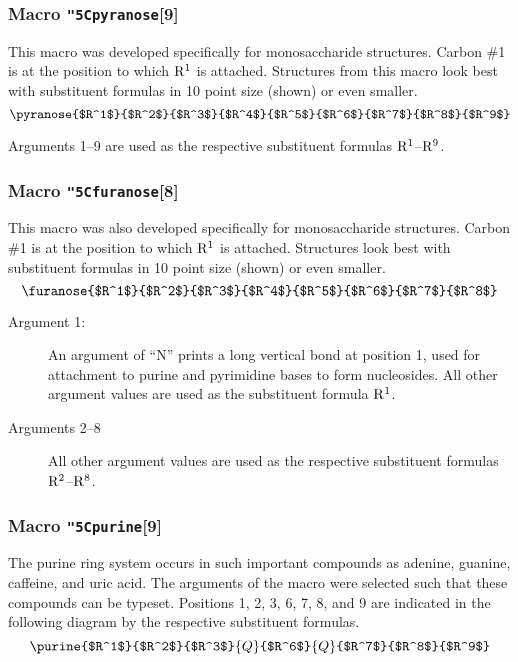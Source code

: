 \subsubsection{Macro {\tt\char"5C{}pyranose}[9]}
  This macro was developed specifically for monosaccharide
 structures. Carbon \#1 is at the position to which
 ${\rm R^1}$ is attached. Structures from this macro look
 best with substituent formulas in 10 point size (shown)
 or even smaller.
 \[ \pyranose{$R^1$}{$R^2$}{$R^3$}{$R^4$}{$R^5$}{$R^6$}
             {$R^7$}{$R^8$}{$R^9$}  \]
 
 Arguments 1--9 are used as the respective substituent
 formulas ${\rm R^1}$--${\rm R^9}$. \rhq
 
 \subsubsection{Macro {\tt\char"5C{}furanose}[8]}
  This macro was also developed specifically for
 monosaccharide structures. Carbon \#1 is at the position
 to which ${\rm R^1}$ is attached. Structures look best
 with substituent formulas in 10 point size (shown)
 or even smaller.
 \[ \furanose{$R^1$}{$R^2$}{$R^3$}{$R^4$}{$R^5$}{$R^6$}
             {$R^7$}{$R^8$}     \]
 
 \begin{description}
 \item[{\rm Argument 1:}] \rhq An argument of ``N''
      prints a long vertical bond at position 1,
      used for attachment to
      purine and pyrimidine bases to form nucleosides.
      All other argument values are used as the substituent
      formula ${\rm R^1}$.
 \item[{\rm Arguments 2--8}] \rhq  All other
      argument values are used as the respective substituent
      formulas ${\rm R^2}$--${\rm R^8}$.
 \end{description}
 
\subsubsection{Macro {\tt\char"5C{}purine}[9]}
  The purine ring system occurs in such important compounds
 as adenine, guanine, caffeine, and uric acid. The arguments
 of the macro were selected such that these compounds can
 be typeset. Positions 1, 2, 3, 6, 7, 8, and 9 are indicated
 in the following diagram by the respective substituent
 formulas.
 \[ \purine{$R^1$}{$R^2$}{$R^3$}{Q}{$R^6$}{Q}{$R^7$}
           {$R^8$}{$R^9$}   \]
 
